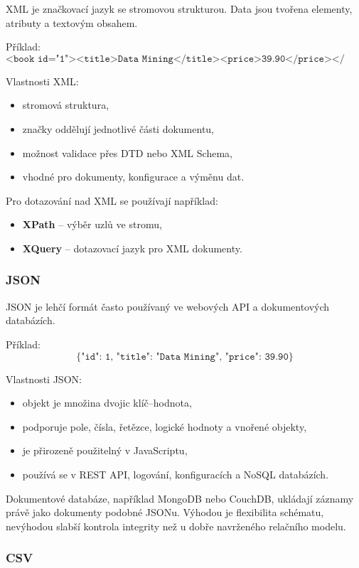 XML je značkovací jazyk se stromovou strukturou. Data jsou tvořena elementy, atributy a textovým obsahem.

Příklad:
\[
\texttt{<book id="1"><title>Data Mining</title><price>39.90</price></book>}
\]

Vlastnosti XML:
\begin{itemize}
    \item stromová struktura,
    \item značky oddělují jednotlivé části dokumentu,
    \item možnost validace přes DTD nebo XML Schema,
    \item vhodné pro dokumenty, konfigurace a výměnu dat.
\end{itemize}

Pro dotazování nad XML se používají například:
\begin{itemize}
    \item \textbf{XPath} -- výběr uzlů ve stromu,
    \item \textbf{XQuery} -- dotazovací jazyk pro XML dokumenty.
\end{itemize}

\subsubsection{JSON}

JSON je lehčí formát často používaný ve webových API a dokumentových databázích.

Příklad:
\[
\texttt{\{"id": 1, "title": "Data Mining", "price": 39.90\}}
\]

Vlastnosti JSON:
\begin{itemize}
    \item objekt je množina dvojic klíč--hodnota,
    \item podporuje pole, čísla, řetězce, logické hodnoty a vnořené objekty,
    \item je přirozeně použitelný v JavaScriptu,
    \item používá se v REST API, logování, konfiguracích a NoSQL databázích.
\end{itemize}

Dokumentové databáze, například MongoDB nebo CouchDB, ukládají záznamy právě jako dokumenty podobné JSONu.
Výhodou je flexibilita schématu, nevýhodou slabší kontrola integrity než u dobře navrženého relačního modelu.

\subsubsection{CSV}

